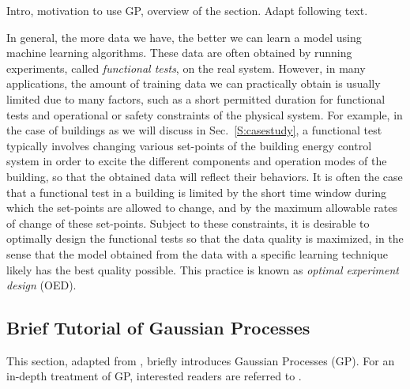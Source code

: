 \begin{todo}
  Intro, motivation to use GP, overview of the section.
  Adapt following text.
\end{todo}

In general, the more data we have, the better we can learn a model using machine learning algorithms.
These data are often obtained by running experiments, called \emph{functional tests}, on the real system.
However, in many applications, the amount of training data we can practically obtain is usually limited due to many factors, such as a short permitted duration for functional tests and operational or safety constraints of the physical system.
For example, in the case of buildings as we will discuss in Sec.~\ref{S:casestudy}, a functional test typically involves changing various set-points of the building energy control system in order to excite the different components and operation modes of the building, so that the obtained data will reflect their behaviors.
It is often the case that a functional test in a building is limited by the short time window during which the set-points are allowed to change, and by the maximum allowable rates of change of these set-points.
Subject to these constraints, it is desirable to optimally design the functional tests so that the data quality is maximized, in the sense that the model obtained from the data with a specific learning technique likely has the best quality possible.
This practice is known as \emph{optimal experiment design} (OED).


\subsection{Brief Tutorial of Gaussian Processes}
\label{sec:modeling:gp}

This section, adapted from \cite{JainICCPS2018}, briefly introduces Gaussian Processes (GP).
For an in-depth treatment of GP, interested readers are referred to \cite{Rasmussen2006}.

